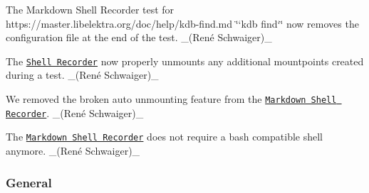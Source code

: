 \begin{DoxyItemize}
\item The Markdown Shell Recorder test for https\+://master.libelektra.\+org/doc/help/kdb-\/find.md \char`\"{}`kdb find`\char`\"{} now removes the configuration file at the end of the test. \+\_\+(René Schwaiger)\+\_\+
\item The \href{(https://master.libelektra.org/tests/shell/shell_recorder)}{\tt Shell Recorder} now properly unmounts any additional mountpoints created during a test. \+\_\+(René Schwaiger)\+\_\+
\item We removed the broken auto unmounting feature from the \href{https://master.libelektra.org/tests/shell/shell_recorder/tutorial_wrapper}{\tt Markdown Shell Recorder}. \+\_\+(René Schwaiger)\+\_\+
\item The \href{https://master.libelektra.org/tests/shell/shell_recorder/tutorial_wrapper}{\tt Markdown Shell Recorder} does not require a {\ttfamily bash} compatible shell anymore. \+\_\+(René Schwaiger)\+\_\+
\end{DoxyItemize}

\subsubsection*{General}


